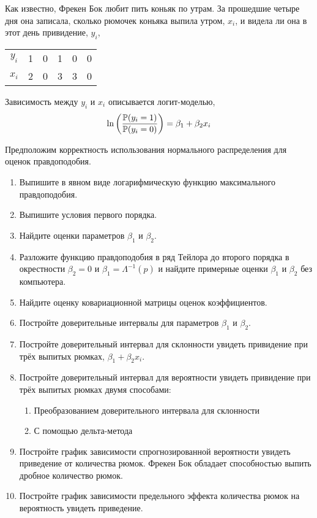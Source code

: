 \begin{problem}
Как известно, Фрекен Бок любит пить коньяк по утрам. За прошедшие четыре дня она записала, сколько рюмочек коньяка выпила утром, $x_i$, и видела ли она в этот день привидение, $y_i$,

\begin{tabular}{c|ccccc}
\toprule
$y_i$ & 1 & 0 & 1 & 0 & 0 \\
$x_i$ & 2 & 0 & 3 & 3 & 0 \\
\bottomrule
\end{tabular}

Зависимость между $y_i$ и $x_i$ описывается логит-моделью,
\[
\ln
\left(
  \frac{\P(y_i=1)}{\P(y_i=0)}
\right)
=\beta_1+\beta_2 x_i
\]

Предположим корректность использования нормального распределения для оценок правдоподобия.

\begin{enumerate}
\item Выпишите в явном виде логарифмическую функцию максимального правдоподобия.
\item Выпишите условия первого порядка.
\item \useR Найдите оценки параметров $\beta_1$ и $\beta_2$.
\item Разложите функцию правдоподобия в ряд Тейлора до второго порядка в окрестности $\beta_2=0$ и $\beta_1=\Lambda^{-1}(\hat p)$ и найдите примерные оценки $\beta_1$ и $\beta_2$ без компьютера.
\item Найдите оценку ковариационной матрицы оценок коэффициентов.
\item Постройте доверительные интервалы для параметров $\beta_1$ и $\beta_2$.
\item Постройте доверительный интервал для склонности увидеть привидение при трёх выпитых рюмках, $\beta_1 + \beta_2 x_i$.
\item Постройте доверительный интервал для вероятности увидеть привидение при трёх выпитых рюмках двумя способами:
\begin{enumerate}
\item Преобразованием доверительного интервала для склонности
\item С помощью дельта-метода
\end{enumerate}
\item Постройте график зависимости спрогнозированной вероятности увидеть приведение от количества рюмок. Фрекен Бок обладает способностью выпить дробное количество рюмок.
\item Постройте график зависимости предельного эффекта количества рюмок на вероятность увидеть приведение.
\end{enumerate}


\begin{sol}
\end{sol}
\end{problem}



